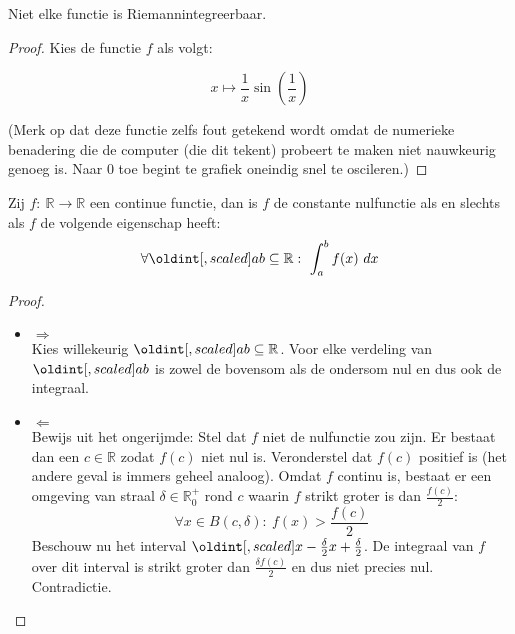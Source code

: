 \documentclass[main.tex]{subfiles}
\begin{document}
\begin{tvb}
  Niet elke functie is Riemannintegreerbaar.

  \begin{proof}
    Kies de functie $f$ als volgt:

    \noindent
    \begin{minipage}{.45\textwidth}
      \begin{figure}[H]
        \centering
      \end{figure}
    \end{minipage}
    \begin{minipage}{.45\textwidth}
      \[ x \mapsto \frac{1}{x}\sin\left(\frac{1}{x}\right) \]
    \end{minipage}

    \noindent(Merk op dat deze functie zelfs fout getekend wordt omdat de numerieke benadering die de computer (die dit tekent) probeert te maken niet nauwkeurig genoeg is. Naar $0$ toe begint te grafiek oneindig snel te oscileren.)
  \end{proof}
\end{tvb}

\begin{st}
  Zij $f:\ \mathbb{R} \rightarrow \mathbb{R}$ een continue functie, dan is $f$ de constante nulfunctie als en slechts als $f$ de volgende eigenschap heeft:
  \[ \forall \interval{a}{b} \subseteq \mathbb{R}:\ \int_{a}^{b}f(x)\ dx\]

  \begin{proof}
    \noindent
    \begin{itemize}
    \item $\Rightarrow$\\
      Kies willekeurig $\interval{a}{b}\subseteq \mathbb{R}$.
      Voor elke verdeling van $\interval{a}{b}$ is zowel de bovensom als de ondersom nul en dus ook de integraal.
    \item $\Leftarrow$\\
      Bewijs uit het ongerijmde: Stel dat $f$ niet de nulfunctie zou zijn.
      Er bestaat dan een $c\in\mathbb{R}$ zodat $f(c)$ niet nul is.
      Veronderstel dat $f(c)$ positief is (het andere geval is immers geheel analoog).
      Omdat $f$ continu is, bestaat er een omgeving van straal $\delta\in\mathbb{R}_{0}^{+}$ rond $c$ waarin $f$ strikt groter is dan $\frac{f(c)}{2}$:
      \[ \forall x \in B(c,\delta):\ f(x) > \frac{f(c)}{2} \]
      Beschouw nu het interval $\interval{x-\frac{\delta}{2}}{x+\frac{\delta}{2}}$.
      De integraal van $f$ over dit interval is strikt groter dan $\frac{\delta f(c)}{2}$ en dus niet precies nul.
      Contradictie.
    \end{itemize}
  \end{proof}
\end{st}
\end{document}
